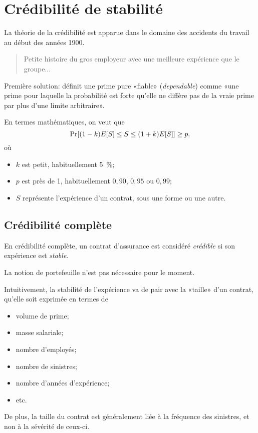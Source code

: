 
\chapter{Crédibilité de stabilité}
\label{chap:stabilite}

La théorie de la crédibilité est apparue dans le domaine des accidents
du travail au début des années 1900.

\begin{quote}
  Petite histoire du gros employeur avec une meilleure expérience que
  le groupe...
\end{quote}

Première solution: \cite{Mowbray:1914} définit une prime pure «fiable»
(\emph{dependable}) comme «une prime pour laquelle la probabilité est
forte qu'elle ne diffère pas de la vraie prime par plus d'une limite
arbitraire».

En termes mathématiques, on veut que
\begin{displaymath}
  \Pr[(1 - k) E [ S ] \leq S \leq (1 + k) E [ S ]] \geq p,
\end{displaymath}
où
\begin{itemize}
\item $k$ est petit, habituellement 5~\%;
\item $p$ est près de 1, habituellement $0,90$, $0,95$ ou $0,99$;
\item $S$ représente l'expérience d'un contrat, sous une forme ou une
  autre.
\end{itemize}


\section{Crédibilité complète}
\label{sec:stabilite:credibilite_complete}

En crédibilité complète, un contrat d'assurance est considéré
\emph{crédible} si son expérience est \emph{stable}.

La notion de portefeuille n'est pas nécessaire pour le moment.

Intuitivement, la stabilité de l'expérience va de pair avec la
«taille» d'un contrat, qu'elle soit exprimée en termes de
\begin{itemize}
\item volume de prime;
\item masse salariale;
\item nombre d'employés;
\item nombre de sinistres;
\item nombre d'années d'expérience;
\item etc.
\end{itemize}
De plus, la taille du contrat est généralement liée à la fréquence des
sinistres, et non à la sévérité de ceux-ci.

